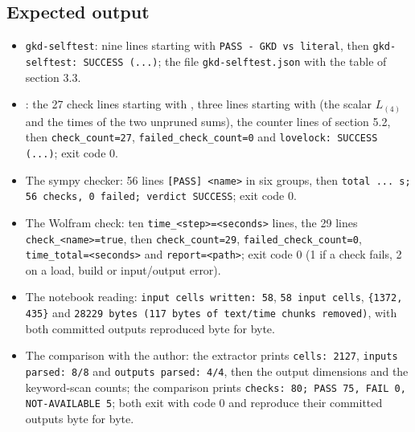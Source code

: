 \documentclass[11pt]{article}
\begin{document}
\subsection{Expected output}

\begin{itemize}
\item \texttt{gkd-self\allowbreak{}test}: nine lines starting with \texttt{PASS - G\allowbreak{}KD vs li\allowbreak{}teral}, then \texttt{gkd-self\allowbreak{}test: SU\allowbreak{}CCESS (.\allowbreak{}..)}; the file \texttt{gkd-self\allowbreak{}test.jso\allowbreak{}n} with the table of section 3.3.
\item \texttt{}: the 27 check lines starting with \texttt{}, three lines starting with \texttt{} (the scalar $L_{(4)}$ and the times of the two unpruned sums), the counter lines of section 5.2, then \texttt{check\_co\allowbreak{}unt=27}, \texttt{failed\_c\allowbreak{}heck\_cou\allowbreak{}nt=0} and \texttt{lovelock\allowbreak{}: SUCCES\allowbreak{}S (...)}; exit code 0.
\item The sympy checker: 56 lines \texttt{[PASS] <\allowbreak{}name>} in six groups, then \texttt{total ..\allowbreak{}. s; 56 \allowbreak{}checks, \allowbreak{}0 failed\allowbreak{}; verdic\allowbreak{}t SUCCES\allowbreak{}S}; exit code 0.
\item The Wolfram check: ten \texttt{time\_<st\allowbreak{}ep>=<sec\allowbreak{}onds>} lines, the 29 lines \texttt{check\_<n\allowbreak{}ame>=tru\allowbreak{}e}, then \texttt{check\_co\allowbreak{}unt=29}, \texttt{failed\_c\allowbreak{}heck\_cou\allowbreak{}nt=0}, \texttt{time\_tot\allowbreak{}al=<seco\allowbreak{}nds>} and \texttt{report=<\allowbreak{}path>}; exit code 0 (1 if a check fails, 2 on a load, build or input/output error).
\item The notebook reading: \texttt{input ce\allowbreak{}lls writ\allowbreak{}ten: 58}, \texttt{58 input\allowbreak{} cells}, \texttt{\{1372, 4\allowbreak{}35\}} and \texttt{28229 by\allowbreak{}tes (117\allowbreak{} bytes o\allowbreak{}f text/t\allowbreak{}ime chun\allowbreak{}ks remov\allowbreak{}ed)}, with both committed outputs reproduced byte for byte.
\item The comparison with the author: the extractor prints \texttt{cells: 2\allowbreak{}127}, \texttt{inputs p\allowbreak{}arsed: 8\allowbreak{}/8} and \texttt{outputs \allowbreak{}parsed: \allowbreak{}4/4}, then the output dimensions and the keyword-scan counts; the comparison prints \texttt{checks: \allowbreak{}80; PASS\allowbreak{} 75, FAI\allowbreak{}L 0, NOT\allowbreak{}-AVAILAB\allowbreak{}LE 5}; both exit with code 0 and reproduce their committed outputs byte for byte.
\end{itemize}
\end{document}

